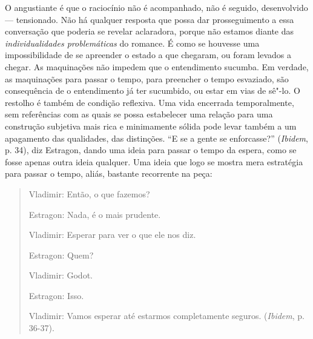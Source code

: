 O angustiante é que o raciocínio não é acompanhado, não é seguido,
desenvolvido --- tensionado. Não há qualquer resposta que possa dar
prosseguimento a essa conversação que poderia se revelar aclaradora,
porque não estamos diante das \emph{individualidades problemáticas} do
romance. É como se houvesse uma impossibilidade de se apreender o estado
a que chegaram, ou foram levados a chegar. As maquinações não impedem
que o entendimento sucumba. Em verdade, as maquinações para passar o
tempo, para preencher o tempo esvaziado, são consequência de o
entendimento já ter sucumbido, ou estar em vias de sê"-lo. O restolho é
também de condição reflexiva. Uma vida encerrada temporalmente, sem
referências com as quais se possa estabelecer uma relação para uma
construção subjetiva mais rica e minimamente sólida pode levar também a
um apagamento das qualidades, das distinções. ``E se a gente se
enforcasse?'' (\emph{Ibidem}, p. 34), diz Estragon, dando uma ideia para
passar o tempo da espera, como se fosse apenas outra ideia qualquer. Uma
ideia que logo se mostra mera estratégia para passar o tempo, aliás,
bastante recorrente na peça:

\begin{quote}
\forceindent{}Vladimir: Então, o que fazemos?

Estragon: Nada, é o mais prudente.

Vladimir: Esperar para ver o que ele nos diz.

Estragon: Quem?

Vladimir: Godot.

Estragon: Isso.

Vladimir: Vamos esperar até estarmos completamente seguros.
(\emph{Ibidem}, p. 36-37).
\end{quote}

